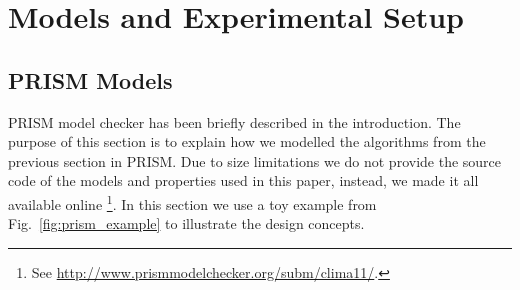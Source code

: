 \documentclass{llncs}
\begin{document}
\section{Models and Experimental Setup}

\subsection{PRISM Models}\label{sect:prismmodels}

PRISM model checker has been briefly described in the introduction. The purpose of this section is to explain how we modelled the algorithms from the previous section in PRISM. Due to size limitations we do not provide the source code of the models and properties used in this paper, instead, we made it all available online%
\footnote{See \url{http://www.prismmodelchecker.org/subm/clima11/}.}.
In this section we use a toy example from Fig.~\ref{fig:prism_example} to illustrate the design concepts.
\end{document}
